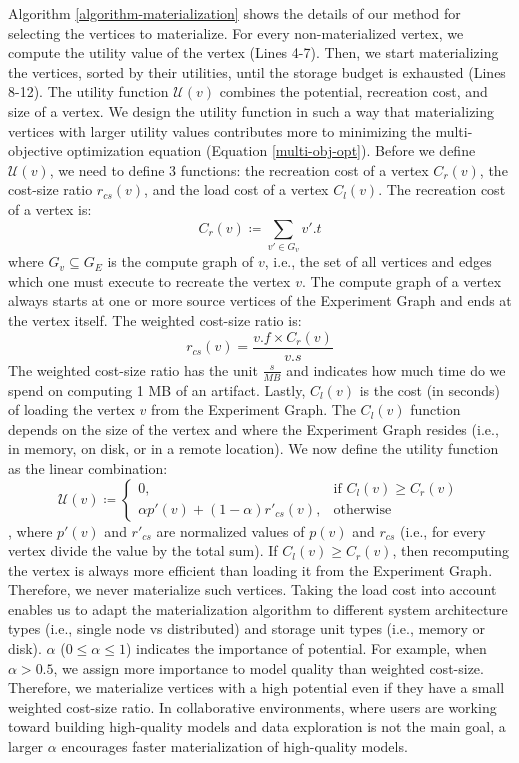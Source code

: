 Algorithm \ref{algorithm-materialization} shows the details of our method for selecting the vertices to materialize.
For every non-materialized vertex, we compute the utility value of the vertex (Lines 4-7).
Then, we start materializing the vertices, sorted by their utilities, until the storage budget is exhausted (Lines 8-12).
The utility function $\mathcal{U}(v)$ combines the potential, recreation cost, and size of a vertex.
We design the utility function in such a way that materializing vertices with larger utility values contributes more to minimizing the multi-objective optimization equation (Equation \ref{multi-obj-opt}).
Before we define $\mathcal{U}(v)$, we need to define 3 functions: the recreation cost of a vertex $C_r(v)$, the cost-size ratio $r_{cs}(v)$, and the load cost of a vertex $C_l(v)$.
The recreation cost of a vertex is:
\[
C_r(v) \coloneqq \sum\limits_{v' \in G_v} v'.t
\]
where $G_v \subseteq G_E$ is the compute graph of $v$, i.e., the set of all vertices and edges which one must execute to recreate the vertex $v$.
The compute graph of a vertex always starts at one or more source vertices of the Experiment Graph and ends at the vertex itself.
The weighted cost-size ratio is:
\[r_{cs}(v) = \frac{v.f  \times C_r(v)}{v.s}\]
The weighted cost-size ratio has the unit $\tfrac{s}{MB}$ and indicates how much time do we spend on computing 1 MB of an artifact.
Lastly, $C_l(v)$ is the cost (in seconds) of loading the vertex $v$ from the Experiment Graph. 
The $C_l(v)$ function depends on the size of the vertex and where the Experiment Graph resides (i.e., in memory, on disk, or in a remote location).
We now define the utility function as the linear combination: 
\[
\mathcal{U}(v) \coloneqq  	
		\begin{cases}
		0, & \text{if }  C_l(v) \ge C_r(v)  \\ 
		\alpha p'(v) + (1-\alpha)r'_{cs}(v), & \text{otherwise}
		\end{cases}
\],
where $p'(v)$ and $r'_{cs}$ are normalized values of $p(v)$ and $r_{cs}$ (i.e., for every vertex divide the value by the total sum).
If $C_l(v) \ge C_r(v)$, then recomputing the vertex is always more efficient than loading it from the Experiment Graph.
Therefore, we never materialize such vertices.
Taking the load cost into account enables us to adapt the materialization algorithm to different system architecture types (i.e., single node vs distributed) and storage unit types (i.e., memory or disk).
$ \alpha$ ($0 \leq \alpha \leq 1$) indicates the importance of potential.
For example, when $\alpha > 0.5$, we assign more importance to model quality than weighted cost-size.
Therefore, we materialize vertices with a high potential even if they have a small weighted cost-size ratio.
In collaborative environments, where users are working toward building high-quality models and data exploration is not the main goal, a larger $\alpha$ encourages faster materialization of high-quality models.


